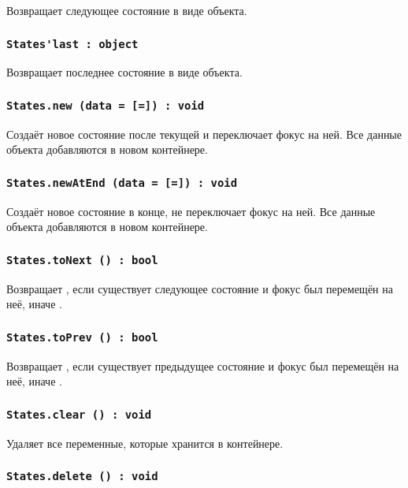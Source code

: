 Возвращает следующее состояние в виде объекта.

\subsubsection{\lstinline|States'last : object|}

Возвращает последнее состояние в виде объекта.

\subsubsection{\lstinline|States.new (data = [=]) : void|}

Создаёт новое состояние после текущей и переключает фокус на ней. Все данные объекта  добавляются в новом контейнере.

\subsubsection{\lstinline|States.newAtEnd (data = [=]) : void|}

Создаёт новое состояние в конце, не переключает фокус на ней. Все данные объекта  добавляются в новом контейнере.

\subsubsection{\lstinline|States.toNext () : bool|}

Возвращает \true, если существует следующее состояние и фокус был перемещён на неё, иначе \false.

\subsubsection{\lstinline|States.toPrev () : bool|}

Возвращает \true, если существует предыдущее состояние и фокус был перемещён на неё, иначе \false.

\subsubsection{\lstinline|States.clear () : void|}

Удаляет все переменные, которые хранится в контейнере.

\subsubsection{\lstinline|States.delete () : void|}

